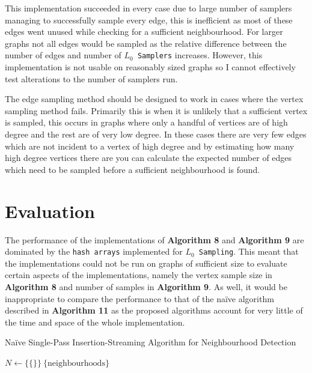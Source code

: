 \documentclass[11pt,twoside,a4paper]{report}
\begin{document}
\par This implementation succeeded in every case due to large number of samplers managing to successfully sample every edge, this is inefficient as most of these edges went unused while checking for a sufficient neighbourhood. For larger graphs not all edges would be sampled as the relative difference between the number of edges and number of \texttt{$L_0$ Samplers} increases. However, this implementation is not usable on reasonably sized graphs so I cannot effectively test alterations to the number of samplers run.

\par The edge sampling method should be designed to work in cases where the vertex sampling method fails. Primarily this is when it is unlikely that a sufficient vertex is sampled, this occurs in graphs where only a handful of vertices are of high degree and the rest are of very low degree. In these cases there are very few edges which are not incident to a vertex of high degree and by estimating how many high degree vertices there are you can calculate the expected number of edges which need to be sampled before a sufficient neighbourhood is found.

\section{Evaluation}

The performance of the implementations of \textbf{Algorithm 8} and \textbf{Algorithm 9} are dominated by the \texttt{hash arrays} implemented for \texttt{$L_0$ Sampling}. This meant that the implementations could not be run on graphs of sufficient size to evaluate certain aspects of the implementations, namely the vertex sample size in \textbf{Algorithm 8} and number of samples in \textbf{Algorithm 9}. As well, it would be inappropriate to compare the performance to that of the naïve algorithm described in \textbf{Algorithm 11} as the proposed algorithms account for very little of the time and space of the whole implementation.

\begin{algorithm}[H]
\caption{Na\"ive Single-Pass Insertion-Streaming Algorithm for Neighbourhood Detection}
$N\leftarrow\{\{\}\}\ \{\text{neighbourhoods}\}$\\
 {
}
\end{algorithm}
\end{document}
